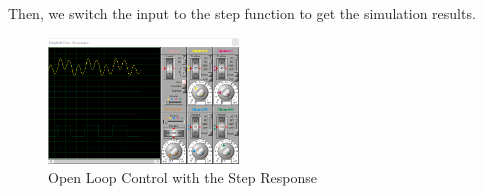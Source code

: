 \documentclass{article}
\begin{document}
{{{        Then, we switch the input to the step function to get the simulation results.
        \begin{figure}[H]
            \begin{small}
                \begin{center}
                    \includegraphics[width=0.45\textwidth]{figures/lab3_7.png}
                \end{center}
                \caption{Open Loop Control with the Step Response}
                \label{fig:lab3_7}
            \end{small}
        \end{figure}
    }
}}
\end{document}
